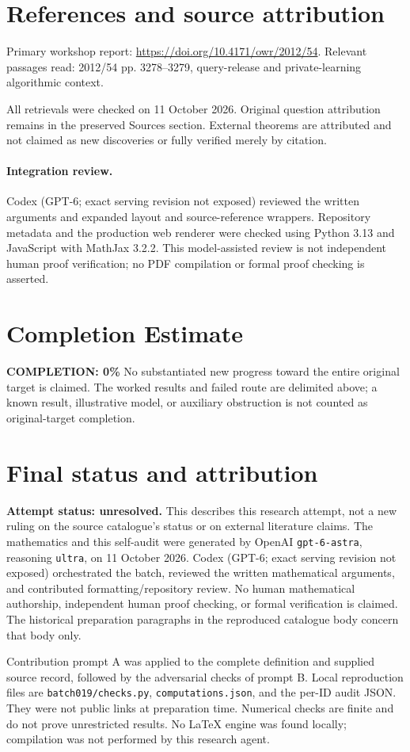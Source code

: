 \documentclass[11pt]{article}
\begin{document}
\section{References and source attribution}
Primary workshop report: \url{https://doi.org/10.4171/owr/2012/54}. Relevant passages read: 2012/54 pp. 3278--3279, query-release and private-learning algorithmic context.

All retrievals were checked on 11 October 2026. Original question attribution remains in the preserved Sources section. External theorems are attributed and not claimed as new discoveries or fully verified merely by citation.


\paragraph{Integration review.} Codex (GPT-6; exact serving revision not exposed) reviewed the written arguments and expanded layout and source-reference wrappers. Repository metadata and the production web renderer were checked using Python 3.13 and JavaScript with MathJax 3.2.2. This model-assisted review is not independent human proof verification; no PDF compilation or formal proof checking is asserted.

\section{Completion Estimate}
\noindent\textbf{COMPLETION: 0\%}
No substantiated new progress toward the entire original target is claimed. The worked results and failed route are delimited above; a known result, illustrative model, or auxiliary obstruction is not counted as original-target completion.

\section{Final status and attribution}
\textbf{Attempt status: unresolved.} This describes this research attempt, not a new ruling on the source catalogue's status or on external literature claims.
The mathematics and this self-audit were generated by OpenAI \texttt{gpt-6-astra}, reasoning \texttt{ultra}, on 11 October 2026. Codex (GPT-6; exact serving revision not exposed) orchestrated the batch, reviewed the written mathematical arguments, and contributed formatting/repository review. No human mathematical authorship, independent human proof checking, or formal verification is claimed. The historical preparation paragraphs in the reproduced catalogue body concern that body only.

Contribution prompt A was applied to the complete definition and supplied source record, followed by the adversarial checks of prompt B. Local reproduction files are \texttt{batch019/checks.py}, \texttt{computations.json}, and the per-ID audit JSON. They were not public links at preparation time. Numerical checks are finite and do not prove unrestricted results. No LaTeX engine was found locally; compilation was not performed by this research agent.
\end{document}
